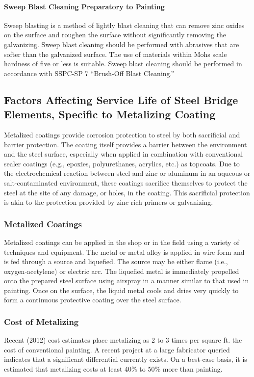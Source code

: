 \paragraph{Sweep Blast Cleaning Preparatory to Painting}
Sweep blasting is a method of lightly blast cleaning that can remove zinc oxides on the surface and roughen the
surface without significantly removing the galvanizing. Sweep blast cleaning should be performed with abrasives that
are softer than the galvanized surface. The use of materials within Mohs scale hardness of five or less is suitable.
Sweep blast cleaning should be performed in accordance with SSPC-SP 7 “Brush-Off Blast Cleaning.”


\subsection{Factors Affecting Service Life of Steel Bridge Elements, Specific to Metalizing Coating}
Metalized coatings provide corrosion protection to steel by both sacrificial and barrier protection. The coating
itself provides a barrier between the environment and the steel surface, especially when applied in combination with
conventional sealer coatings (e.g., epoxies, polyurethanes, acrylics, etc.) as topcoats. Due to the electrochemical
reaction between steel and zinc or aluminum in an aqueous or salt-contaminated environment, these coatings
sacrifice themselves to protect the steel at the site of any damage, or holes, in the coating. This sacrificial protection
is akin to the protection provided by zinc-rich primers or galvanizing.

\subsubsection{Metalized Coatings}
Metalized coatings can be applied in the shop or in the field using a variety of techniques and equipment. The
metal or metal alloy is applied in wire form and is fed through a source and liquefied. The source may be either
flame (i.e., oxygen-acetylene) or electric arc. The liquefied metal is immediately propelled onto the prepared steel
surface using airspray in a manner similar to that used in painting. Once on the surface, the liquid metal cools and
dries very quickly to form a continuous protective coating over the steel surface.

\subsubsection{Cost of Metalizing}
Recent (2012) cost estimates place metalizing as 2 to 3 times per square ft. the cost of conventional painting. A
recent project at a large fabricator queried indicates that a significant differential currently exists. On a best-case
basis, it is estimated that metalizing costs at least 40\% to 50\% more than painting.

